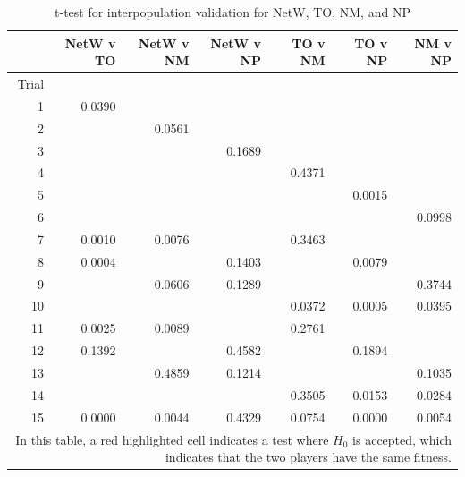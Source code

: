 \begin{table}[htbp]
  \centering
  \caption{t-test for interpopulation validation for NetW, TO, NM, and NP}
    \begin{tabular}{rrrrrrr}
    \toprule
          & NetW v TO & NetW v NM & NetW v NP & TO v NM & TO v NP & NM v NP \\
    \midrule
    Trial &        &        &        &        &        &  \\
    1     & \cellcolor{red!55!white}0.0390 &        &        &        &        &
    \\
    2     &        & \cellcolor{red!55!white}0.0561 &        &        &        &
    \\
    3     &        &        & \cellcolor{red!55!white}0.1689 &        &        &
    \\
    4     &        &        &        & \cellcolor{red!55!white}0.4371 &        &
    \\
    5     &        &        &        &        & 0.0015 &  \\
    6     &        &        &        &        &        &
    \cellcolor{red!55!white}0.0998 \\
    7     & 0.0010 & 0.0076 &        & \cellcolor{red!55!white}0.3463 &        &
    \\
    8     & 0.0004 &        & \cellcolor{red!55!white}0.1403 &        & 0.0079 &
    \\
    9     &        & \cellcolor{red!55!white}0.0606 &
    \cellcolor{red!55!white}0.1289 &        &        &
    \cellcolor{red!55!white}0.3744 \\
    10    &        &        &        & \cellcolor{red!55!white}0.0372 & 0.0005 &
    \cellcolor{red!55!white}0.0395 \\
    11    & 0.0025 & 0.0089 &        & \cellcolor{red!55!white}0.2761 &        &
    \\
    12    & \cellcolor{red!55!white}0.1392 &        &
    \cellcolor{red!55!white}0.4582 &        & \cellcolor{red!55!white}0.1894 &
    \\
    13    &        & \cellcolor{red!55!white}0.4859 &
    \cellcolor{red!55!white}0.1214 &        &        &
    \cellcolor{red!55!white}0.1035 \\
    14    &        &        &        & \cellcolor{red!55!white}0.3505 &
    \cellcolor{red!55!white}0.0153 & \cellcolor{red!55!white}0.0284 \\
    15    & 0.0000 & 0.0044 & \cellcolor{red!55!white}0.4329 &
    \cellcolor{red!55!white}0.0754 & 0.0000 & 0.0054 \\
    \bottomrule
  \multicolumn{7}{p{0.95\linewidth}}{In this table, a red highlighted cell
  indicates a test where $H_{0}$ is accepted, which indicates that the two
  players have the same fitness.}
    \end{tabular}%
  \label{tab:interpop_ttest3}%
\end{table}%

